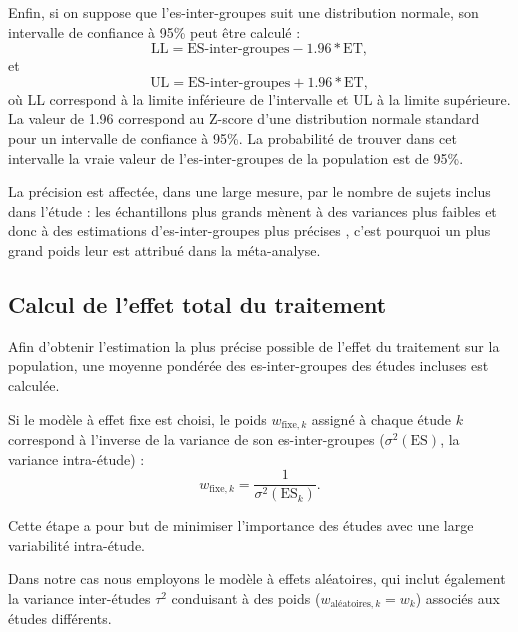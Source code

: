 Enfin, si on suppose que l'\gls{es}-inter-groupes suit une distribution normale, son intervalle de confiance à 95\% peut être calculé \citep{Borenstein2009} :
\begin{equation}
\label{eq:metareview_es_between_confidence_interval_95_lower_bound}
\text{LL} = \text{ES-inter-groupes} - 1.96 * \text{ET},
\end{equation}
et 
\begin{equation}
\label{eq:metareview_es_between_confidence_interval_95_upper_bound}
\text{UL} = \text{ES-inter-groupes} + 1.96 * \text{ET},
\end{equation}
où LL correspond à la limite inférieure de l'intervalle et UL à la limite supérieure. La valeur de 1.96 correspond au Z-score d'une distribution 
normale standard pour un intervalle de confiance à 95\%. La probabilité de trouver dans cet intervalle
la vraie valeur de l'\gls{es}-inter-groupes de la population est de 95\%.

La précision est affectée, dans une large mesure, par le nombre de sujets inclus dans l'étude : les échantillons plus grands mènent à des
variances plus faibles et donc à des estimations d'\gls{es}-inter-groupes plus précises \citep{Borenstein2009}, c'est pourquoi un plus grand 
poids leur est attribué dans la méta-analyse.

\subsection{Calcul de l'effet total du traitement} \label{compute_summary_effect}

Afin d'obtenir l'estimation la plus précise possible de l'effet du traitement sur la population, une moyenne pondérée des \gls{es}-inter-groupes 
des études incluses est calculée.

Si le modèle à effet fixe est choisi, le poids $w_{\text{fixe},k}$ assigné à chaque étude $k$ correspond à l'inverse de la variance de son 
\gls{es}-inter-groupes ($\sigma^2(\text{ES})$, la variance intra-étude) \citep{Borenstein2009} :
\begin{equation}
\label{eq:metareview_weight_fixed_study}
w_{\text{fixe},k} = \frac{1}{\sigma^2(\text{ES}_k)}.
\end{equation} 

Cette étape a pour but de minimiser l'importance des études avec une large variabilité intra-étude.

Dans notre cas nous employons le modèle à effets aléatoires, qui inclut également la variance inter-études $\tau^2$ conduisant à des 
poids ($w_{\text{aléatoires},k} = w_k$) associés aux études différents.

